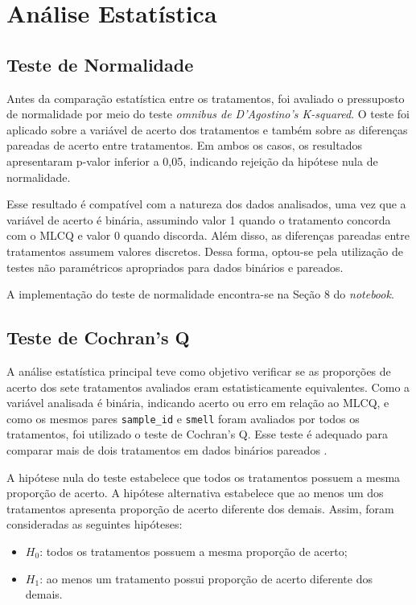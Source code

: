 \section{Análise Estatística}

\subsection{Teste de Normalidade}

Antes da comparação estatística entre os tratamentos, foi avaliado o pressuposto de normalidade por meio do teste \textit{omnibus de D’Agostino’s K-squared}. 
O teste foi aplicado sobre a variável de acerto dos tratamentos e também sobre as diferenças pareadas de acerto entre tratamentos.  
Em ambos os casos, os resultados apresentaram p-valor inferior a 0,05, indicando rejeição da hipótese nula de normalidade.

Esse resultado é compatível com a natureza dos dados analisados, uma vez que a variável de acerto é binária, assumindo valor 1 quando o 
tratamento concorda com o MLCQ e valor 0 quando discorda. Além disso, as diferenças pareadas entre tratamentos assumem valores discretos. 
Dessa forma, optou-se pela utilização de testes não paramétricos apropriados para dados binários e pareados.

A implementação do teste de normalidade encontra-se na Seção 8 do \textit{notebook}.

\subsection{Teste de Cochran's Q}

A análise estatística principal teve como objetivo verificar se as proporções de acerto dos sete tratamentos avaliados eram estatisticamente equivalentes. 
Como a variável analisada é binária, indicando acerto ou erro em relação ao MLCQ, e como os mesmos pares \texttt{sample\_id} e \texttt{smell} 
foram avaliados por todos os tratamentos, foi utilizado o teste de Cochran's Q. Esse teste é adequado para comparar mais de dois tratamentos em dados 
binários pareados \cite{conover1999practical}.

A hipótese nula do teste estabelece que todos os tratamentos possuem a mesma proporção de acerto. A hipótese alternativa estabelece que ao menos 
um dos tratamentos apresenta proporção de acerto diferente dos demais. Assim, foram consideradas as seguintes hipóteses:

\begin{itemize}
    \item $H_0$: todos os tratamentos possuem a mesma proporção de acerto;
    \item $H_1$: ao menos um tratamento possui proporção de acerto diferente dos demais.
\end{itemize}

